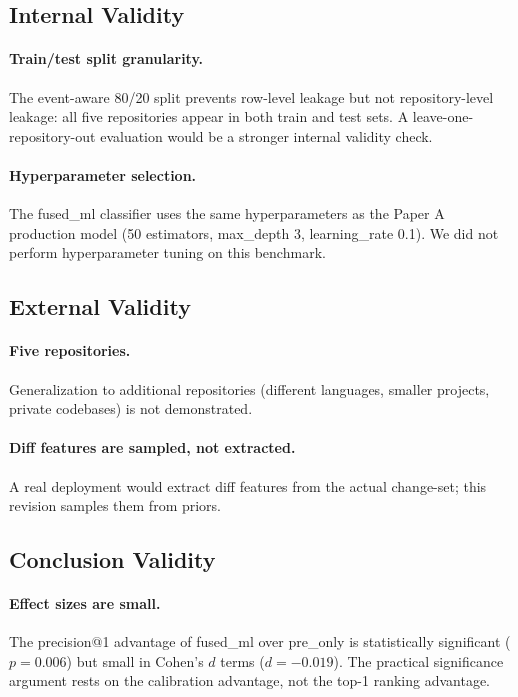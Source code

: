 \documentclass[10pt,twocolumn,letterpaper]{article}
\begin{document}
\subsection{Internal Validity}

\paragraph{Train/test split granularity.} The event-aware 80/20
split prevents row-level leakage but not repository-level
leakage: all five repositories appear in both train and test sets.
A leave-one-repository-out evaluation would be a stronger internal
validity check.

\paragraph{Hyperparameter selection.} The fused\_ml classifier uses
the same hyperparameters as the Paper A production model (50
estimators, max\_depth 3, learning\_rate 0.1). We did not perform
hyperparameter tuning on this benchmark.

\subsection{External Validity}

\paragraph{Five repositories.} Generalization to additional
repositories (different languages, smaller projects, private
codebases) is not demonstrated.

\paragraph{Diff features are sampled, not extracted.} A real
deployment would extract diff features from the actual change-set;
this revision samples them from priors.

\subsection{Conclusion Validity}

\paragraph{Effect sizes are small.} The precision@1 advantage of
fused\_ml over pre\_only is statistically significant
($p = 0.006$) but small in Cohen's $d$ terms ($d = -0.019$). The
practical significance argument rests on the calibration advantage,
not the top-1 ranking advantage.
\end{document}
